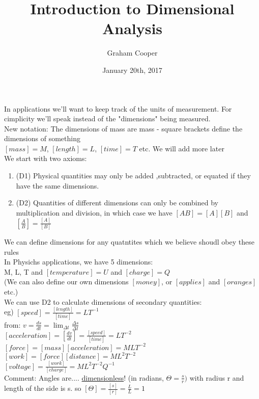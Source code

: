 \documentclass[12pt]{article}
\title{\vspace{-15ex}Introduction to Dimensional Analysis\vspace{-1ex}}
\date{January 20th, 2017}
\author{Graham Cooper}
\begin{document}
	\maketitle
	
	In applications we'll want to keep track of the units of measurement. For cimplicity we'll speak instead of the "dimensions" being measured.\\
	New notation: The dimensions of mass are mass - square brackets define the dimensions of something\\
	$[mass] = M$, $[length] = L$, $[time] = T$ etc. We will add more later\\
	
	We start with two axioms:\\
	\begin{enumerate}
		\item (D1) Physical quantities may only be added ,subtracted, or equated if they have the same dimensions.
		\item (D2) Quantities of different dimensions can only be combined by multiplication and division, in which case we have $[AB] = [A][B]$ and $[\frac{A}{B}] = \frac{[A]}{[B]}$
	\end{enumerate}

	We can define dimensions for any quatntites which we believe shoudl obey these rules\\
	In Physichs applications, we have 5 dimensions:\\
	M, L, T and $[temperature] = U$ and $[charge] = Q$\\
	(We can also define our own dimensions $[money]$, or $[applies]$ and $[oranges]$ etc.)\\
	
	We can use D2 to calculate dimensions of secondary quantities:\\
	eg) $[speed] = \frac{[length]}{[time]} = LT^{-1}$\\
	from: $v = \frac{ds}{dt} = \lim_{\Delta t}\frac{\Delta s}{\Delta t}$\\
	
	$[acceleration] = [\frac{dv}{dt}] = \frac{[speed]}{[time]} = LT^{-2}$\\
	$[force] = [mass][acceleration] = MLT^{-2}$\\
	$[work] = [force][distance] = ML^2T^{-2}$\\
	$[voltage] = \frac{[work]}{[charge]} = ML^2T^{-2}Q^{-1}$\\
	
	Comment: Angles are.... \underline{dimensionless}! (in radians, $\Theta = \frac{s}{r})$ with radius r and length of the side is s. so $[\Theta] = \frac{[s]}{[r]} = \frac{L}{L} = 1$\\
	
\end{document}
